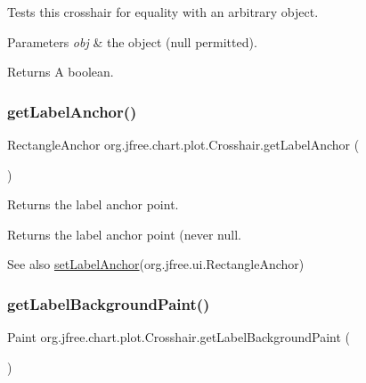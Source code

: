 Tests this crosshair for equality with an arbitrary object.


\begin{DoxyParams}{Parameters}
{\em obj} & the object ({\ttfamily null} permitted).\\
\hline
\end{DoxyParams}
\begin{DoxyReturn}{Returns}
A boolean. 
\end{DoxyReturn}
\mbox{\label{classorg_1_1jfree_1_1chart_1_1plot_1_1_crosshair_a4615a9fac60f3e5cf4b3de47e0cff882}} 
\subsubsection{\texorpdfstring{get\+Label\+Anchor()}{getLabelAnchor()}}
{\footnotesize\ttfamily Rectangle\+Anchor org.\+jfree.\+chart.\+plot.\+Crosshair.\+get\+Label\+Anchor (\begin{DoxyParamCaption}{ }\end{DoxyParamCaption})}

Returns the label anchor point.

\begin{DoxyReturn}{Returns}
the label anchor point (never {\ttfamily null}.
\end{DoxyReturn}
\begin{DoxySeeAlso}{See also}
\mbox{\hyperlink{classorg_1_1jfree_1_1chart_1_1plot_1_1_crosshair_aeed2589fd0bc2003dca5fada8aa2f7f3}{set\+Label\+Anchor}}(org.\+jfree.\+ui.\+Rectangle\+Anchor) 
\end{DoxySeeAlso}
\mbox{\label{classorg_1_1jfree_1_1chart_1_1plot_1_1_crosshair_a26faed5cbc5180e8843d2e9daf7108f0}} 
\subsubsection{\texorpdfstring{get\+Label\+Background\+Paint()}{getLabelBackgroundPaint()}}
{\footnotesize\ttfamily Paint org.\+jfree.\+chart.\+plot.\+Crosshair.\+get\+Label\+Background\+Paint (\begin{DoxyParamCaption}{ }\end{DoxyParamCaption})}

